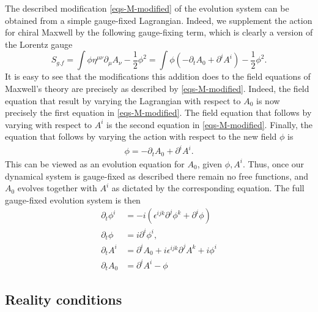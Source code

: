 \documentclass[10pt]{report}
\theoremstyle{definition}
\newcommand{\im}{i}
\begin{document}
The described modification \cref{eqs-M-modified} of the evolution system can be obtained from a simple gauge-fixed Lagrangian. Indeed, we supplement the action for chiral Maxwell by the following gauge-fixing term, which is clearly a version of the Lorentz gauge
\begin{equation}\label{gf-M}
    S_{g.f} = \int \phi \eta^{\mu\nu} \partial_\mu A_\nu - \frac{1}{2} \phi^2 = \int \phi ( - \partial_t A_0 + \partial^i A^i) - \frac{1}{2} \phi^2.
\end{equation}
It is easy to see that the modifications this addition does to the field equations of Maxwell's theory are precisely as described by \cref{eqs-M-modified}. Indeed, the field equation that result by varying the Lagrangian with respect to $A_0$ is now precisely the first equation in \cref{eqs-M-modified}. The field equation that follows by varying with respect to $A^i$ is the second equation in \cref{eqs-M-modified}. 
Finally, the equation that follows by varying the action with respect to the new field $\phi$ is
\begin{align}\label{evol-eqn-A0}
\phi = - \partial_t A_0 + \partial^i A^i.
\end{align}
This can be viewed as an evolution equation for $A_0$, given $\phi, A^i$. Thus, once our dynamical system is gauge-fixed as described there remain no free functions, and $A_0$ evolves together with $A^i$ as dictated by the corresponding equation. The full gauge-fixed evolution system is then 
\begin{align}
    \partial_t \phi^i & = - \im (\epsilon^{ijk} \partial^j \phi^k + \partial^i \phi) \label{eq:evol-phi-i}\\ 
    \partial_t \phi & = \im \partial^i \phi^i, \label{eq:evol-phi}\\
    \partial_t A^i & = \partial^i A_0 + \im \epsilon^{ijk} \partial^j A^k + \im \phi^i \label{eq:evol-A-i}\\
    \partial_t A_0 & = \partial^i A^i - \phi \label{eq:evol-A-0}
\end{align}

\subsection{Reality conditions} \label{subsec:num-pure-conn-maxwell-reality-conditions}
\end{document}
